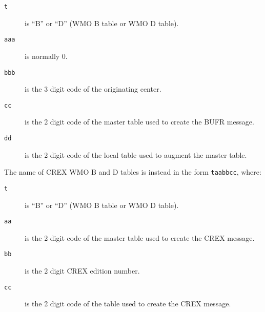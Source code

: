 \begin{description}
\item[{\tt t}] is ``B'' or ``D'' (WMO B table or WMO D table).
\item[{\tt aaa}] is normally 0.
\item[{\tt bbb}] is the 3 digit code of the originating center.
\item[{\tt cc}] is the 2 digit code of the master table used to create the BUFR
                message.
\item[{\tt dd}] is the 2 digit code of the local table used to augment the
                master table.
\end{description}

The name of CREX WMO B and D tables is instead in the form {\tt taabbcc}, where:

\begin{description}
\item[{\tt t}] is ``B'' or ``D'' (WMO B table or WMO D table).
\item[{\tt aa}] is the 2 digit code of the master table used to create the CREX
                message.
\item[{\tt bb}] is the 2 digit CREX edition number.
\item[{\tt cc}] is the 2 digit code of the table used to create the CREX
                message.
\end{description}
